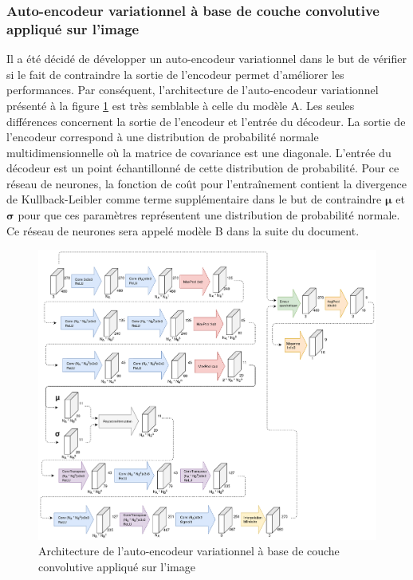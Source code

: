 \subsubsection{Auto-encodeur variationnel à base de couche convolutive appliqué sur l'image}
    Il a été décidé de développer un auto-encodeur variationnel dans le but de vérifier si le fait de contraindre la sortie de l'encodeur permet d'améliorer les performances. Par conséquent, l'architecture de l'auto-encodeur variationnel présenté à la figure \ref{fig:architecture_cnn_vae} est très semblable à celle du modèle A. Les seules différences concernent la sortie de l'encodeur et l'entrée du décodeur. La sortie de l'encodeur correspond à une distribution de probabilité normale multidimensionnelle où la matrice de covariance est une diagonale. L'entrée du décodeur est un point échantillonné de cette distribution de probabilité. Pour ce réseau de neurones, la fonction de coût pour l'entraînement contient la divergence de Kullback-Leibler comme terme supplémentaire dans le but de contraindre \(\boldsymbol{\mu}\) et \(\boldsymbol{\sigma}\) pour que ces paramètres représentent une distribution de probabilité normale. Ce réseau de neurones sera appelé modèle B dans la suite du document.
    \begin{figure}
        \centering
        \includegraphics[width=17cm]{images/Architecture_CnnVae.png}
        \caption{Architecture de l'auto-encodeur variationnel à base de couche convolutive appliqué sur l'image}
        \label{fig:architecture_cnn_vae}
    \end{figure}

